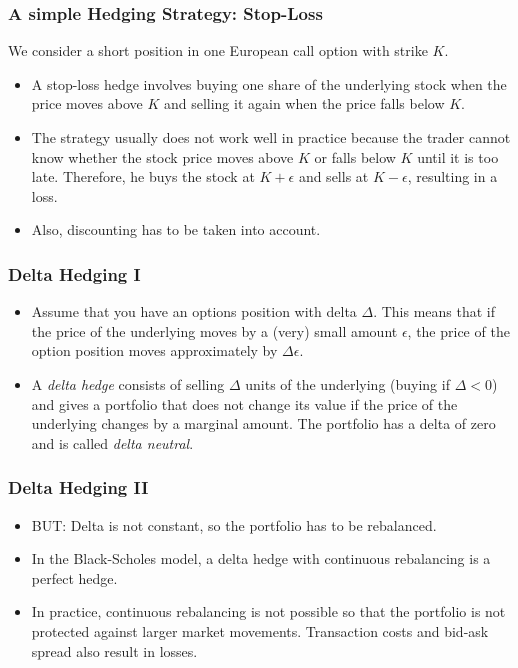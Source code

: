 \begin{frame}[fragile]
\frametitle{A simple Hedging Strategy: Stop-Loss}
We consider a short position in one European call option with strike $K$. 
\begin{itemize}
  \item A stop-loss hedge involves buying one share of the underlying stock when
  the price moves above $K$ and selling it again when the price falls below $K$.
  \item The strategy usually does not work well in practice because the trader
  cannot know whether the stock price moves above $K$ or falls below $K$ until
  it is too late. Therefore, he buys the stock at $K+\epsilon$ and sells at
  $K-\epsilon$, resulting in a loss.
  \item Also, discounting has to be taken into account.
\end{itemize}
\end{frame}


\begin{frame}[fragile]
\frametitle{Delta Hedging I}
\begin{itemize}
  \item Assume that you have an options position with delta $\Delta$. This means
  that if the price of the underlying moves by a (very) small amount $\epsilon$, the
  price of the option position moves approximately by $\Delta \epsilon$.
  \item A \emph{delta hedge} consists of selling $\Delta$ units of the
  underlying (buying if $\Delta <0$) and gives a portfolio that does not
  change its value if the price of the underlying changes by a marginal amount.
  The portfolio has a delta of zero and is called \emph{delta neutral}.
\end{itemize}
\end{frame}

\begin{frame}[fragile]
\frametitle{Delta Hedging II}
\begin{itemize}
  \item BUT: Delta is not constant, so the portfolio has to be rebalanced.
  \item In the Black-Scholes model, a delta hedge with continuous rebalancing is
  a perfect hedge.
  \item In practice, continuous rebalancing is not possible so that the
  portfolio is not protected against larger market movements. Transaction
  costs and bid-ask spread also result in losses.
\end{itemize}
\end{frame} 
 


